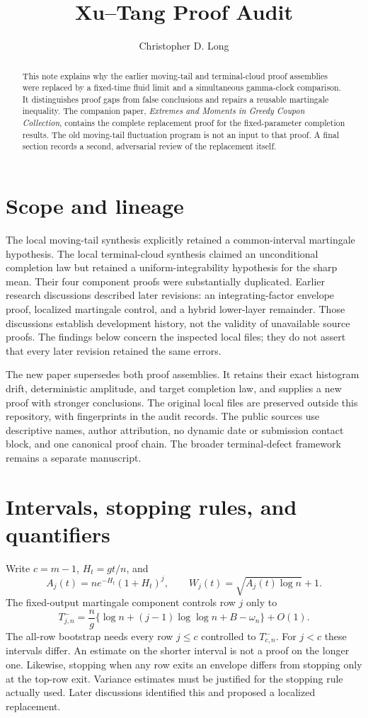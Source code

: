 \documentclass[11pt]{article}
\title{Xu--Tang Proof Audit}
\author{Christopher D. Long}
\date{}
\begin{document}
\maketitle
\begin{abstract}
This note explains why the earlier moving-tail and terminal-cloud proof
assemblies were replaced by a fixed-time fluid limit and a simultaneous
gamma-clock comparison. It distinguishes proof gaps from false conclusions
and repairs a reusable martingale inequality. The companion paper,
\emph{Extremes and Moments in Greedy Coupon Collection}, contains the complete
replacement proof for the fixed-parameter completion results. The old
moving-tail fluctuation program is not an input to that proof. A final
section records a second, adversarial review of the replacement itself.
\end{abstract}

\section{Scope and lineage}
The local moving-tail synthesis explicitly retained a common-interval
martingale hypothesis. The local terminal-cloud synthesis claimed an
unconditional completion law but retained a uniform-integrability hypothesis
for the sharp mean. Their four component proofs were substantially duplicated.
Earlier research discussions described later revisions: an integrating-factor
envelope proof, localized martingale control, and a hybrid lower-layer
remainder. Those discussions establish development history, not the validity
of unavailable source proofs. The findings below concern the inspected local
files; they do not assert that every later revision retained the same errors.

The new paper supersedes both proof assemblies. It retains their exact
histogram drift, deterministic amplitude, and target completion law, and
supplies a new proof with stronger conclusions. The original local files are
preserved outside this repository, with fingerprints in the audit records.
The public sources use descriptive names, author attribution, no dynamic date
or submission contact block, and one canonical proof chain. The broader
terminal-defect framework remains a separate manuscript.

\section{Intervals, stopping rules, and quantifiers}
Write $c=m-1$, $H_t=gt/n$, and
\[
 A_j(t)=ne^{-H_t}(1+H_t)^j,\qquad W_j(t)=\sqrt{A_j(t)\log n}+1.
\]
The fixed-output martingale component controls row $j$ only to
\[
 T^-_{j,n}=\frac ng\{\log n+(j-1)\log\log n+B-\omega_n\}+O(1).
\]
The all-row bootstrap needs every row $j\le c$ controlled to $T^-_{c,n}$.
For $j<c$ these intervals differ. An estimate on the shorter interval is
not a proof on the longer one. Likewise, stopping when any row exits an
envelope differs from stopping only at the top-row exit. Variance estimates
must be justified for the stopping rule actually used. Later discussions
identified this and proposed a localized replacement.
\end{document}
